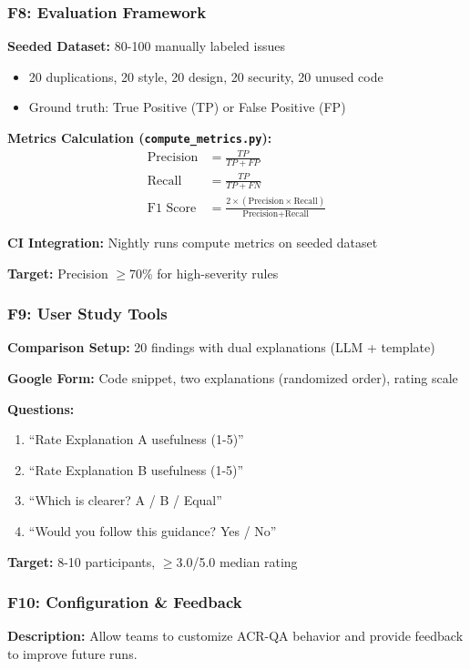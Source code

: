 \documentclass[11pt,a4paper]{article}
\begin{document}
\subsubsection{F8: Evaluation Framework}
\textbf{Seeded Dataset:} 80-100 manually labeled issues
\begin{itemize}[leftmargin=*]
    \item 20 duplications, 20 style, 20 design, 20 security, 20 unused code
    \item Ground truth: True Positive (TP) or False Positive (FP)
\end{itemize}

\textbf{Metrics Calculation (\texttt{compute\_metrics.py}):}
\begin{align*}
\text{Precision} &= \frac{TP}{TP + FP} \\
\text{Recall} &= \frac{TP}{TP + FN} \\
\text{F1 Score} &= \frac{2 \times (\text{Precision} \times \text{Recall})}{\text{Precision} + \text{Recall}}
\end{align*}

\textbf{CI Integration:} Nightly runs compute metrics on seeded dataset

\textbf{Target:} Precision $\geq$70\% for high-severity rules

\subsubsection{F9: User Study Tools}
\textbf{Comparison Setup:} 20 findings with dual explanations (LLM + template)

\textbf{Google Form:} Code snippet, two explanations (randomized order), rating scale

\textbf{Questions:}
\begin{enumerate}
    \item ``Rate Explanation A usefulness (1-5)''
    \item ``Rate Explanation B usefulness (1-5)''
    \item ``Which is clearer? A / B / Equal''
    \item ``Would you follow this guidance? Yes / No''
\end{enumerate}

\textbf{Target:} 8-10 participants, $\geq$3.0/5.0 median rating

\subsubsection{F10: Configuration \& Feedback}
\textbf{Description:} Allow teams to customize ACR-QA behavior and provide feedback to improve future runs.
\end{document}
